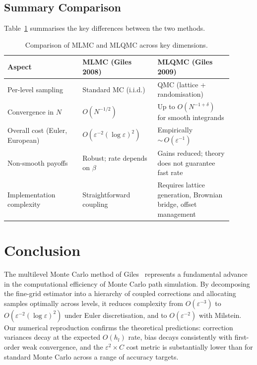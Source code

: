 \documentclass[11pt]{article}
\begin{document}
\subsection{Summary Comparison}

Table~\ref{tab:comparison} summarises the key differences between the two methods.

\begin{table}[H]
\centering
\small
\setlength{\tabcolsep}{5pt}
\renewcommand{\arraystretch}{1.15}
\begin{tabular}{p{0.30\linewidth} p{0.30\linewidth} p{0.30\linewidth}}
\toprule
\textbf{Aspect} & \textbf{MLMC (Giles 2008)} & \textbf{MLQMC (Giles 2009)} \\
\midrule
Per-level sampling & Standard MC (i.i.d.) & QMC (lattice + randomisation) \\
Convergence in $N$ & $O(N^{-1/2})$ & Up to $O(N^{-1+\delta})$ for smooth integrands \\
Overall cost (Euler, European) & $O(\varepsilon^{-2}(\log\varepsilon)^{2})$ & Empirically ${\sim}\,O(\varepsilon^{-1})$ \\
Non-smooth payoffs & Robust; rate depends on $\beta$ & Gains reduced; theory does not guarantee fast rate \\
Implementation complexity & Straightforward coupling & Requires lattice generation, Brownian bridge, offset management \\
\bottomrule
\end{tabular}
\caption{Comparison of MLMC and MLQMC across key dimensions.}
\label{tab:comparison}
\end{table}

\section{Conclusion}

The multilevel Monte Carlo method of Giles~\cite{giles2008} represents a fundamental advance in the computational efficiency of Monte Carlo path simulation. By decomposing the fine-grid estimator into a hierarchy of coupled corrections and allocating samples optimally across levels, it reduces complexity from $O(\varepsilon^{-3})$ to $O(\varepsilon^{-2}(\log\varepsilon)^{2})$ under Euler discretisation, and to $O(\varepsilon^{-2})$ with Milstein. Our numerical reproduction confirms the theoretical predictions: correction variances decay at the expected $O(h_{l})$ rate, bias decays consistently with first-order weak convergence, and the $\varepsilon^{2} \times C$ cost metric is substantially lower than for standard Monte Carlo across a range of accuracy targets.
\end{document}

